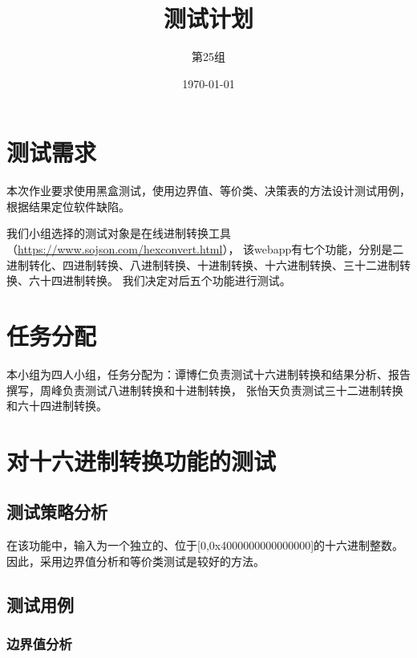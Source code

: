 \documentclass[12pt, a4paper, oneside]{ctexart}
\title{\textbf{测试计划}}
\author{第25组}
\date{\today}
\begin{document}
\maketitle
\section{测试需求}
本次作业要求使用黑盒测试，使用边界值、等价类、决策表的方法设计测试用例，根据结果定位软件缺陷。

我们小组选择的测试对象是在线进制转换工具（\url{https://www.sojson.com/hexconvert.html}），
该webapp有七个功能，分别是二进制转化、四进制转换、八进制转换、十进制转换、十六进制转换、三十二进制转换、六十四进制转换。
我们决定对后五个功能进行测试。

\section{任务分配}
本小组为四人小组，任务分配为：谭博仁负责测试十六进制转换和结果分析、报告撰写，周峰负责测试八进制转换和十进制转换，
张怡天负责测试三十二进制转换和六十四进制转换。


\section{对十六进制转换功能的测试}

\subsection{测试策略分析}

在该功能中，输入为一个独立的、位于[0,0x4000000000000000]的十六进制整数。因此，采用边界值分析和等价类测试是较好的方法。

\subsection{测试用例}

\subsubsection{边界值分析}
\end{document}
